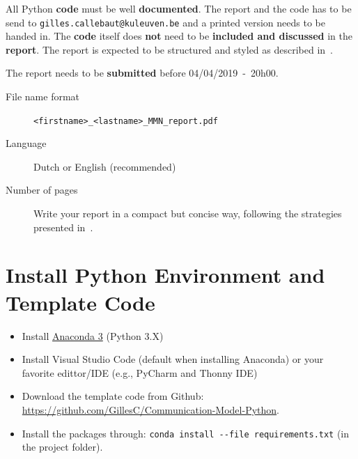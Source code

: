 \documentclass[12pt,a4paper]{article}
\newcommand{\softDeadline}{04/04/2019\ -\ 20h00}
\begin{document}
All Python \textbf{code} must be well \textbf{documented}.
The report and the code has to be send to \texttt{gilles.callebaut@kuleuven.be} and a printed version needs to be handed in. The \textbf{code} itself does \textbf{not} need to be \textbf{included and discussed} in the \textbf{report}. 
The report is expected to be structured and styled as described in~\cite{hoogenboom2012write,kallestinova2011write}.

The report needs to be \textbf{submitted} before \softDeadline.

\begin{description}
	\item[File name format]  \texttt{<firstname>\_<lastname>\_MMN\_report.pdf}
	\item[Language] Dutch or English (recommended)
	\item[Number of pages] Write your report in a compact but concise way, following the
	strategies presented in~\cite{hoogenboom2012write,kallestinova2011write}.
\end{description}

\cleardoublepage%
\appendix
\section{Install Python Environment and Template Code}
\begin{itemize}
	\item Install \href{https://www.anaconda.com/distribution/#download-section}{Anaconda 3} (Python 3.X)
	\item Install Visual Studio Code (default when installing Anaconda) or your favorite edittor/IDE (e.g., PyCharm and Thonny IDE)
	\item Download the template code from Github: \url{https://github.com/GillesC/Communication-Model-Python}.
	\item Install the packages through: \texttt{conda install -{}-file requirements.txt} (in the project folder).
\end{itemize}






\end{document}
